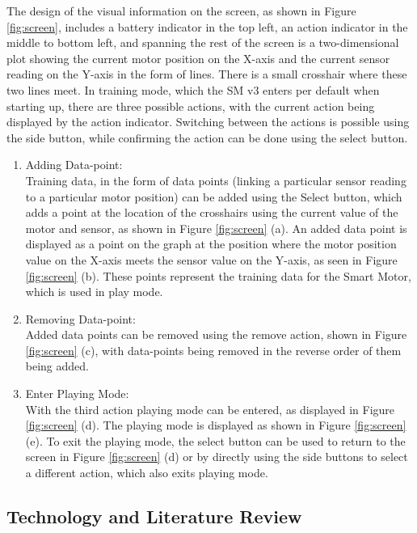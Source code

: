 The design of the visual information on the screen, as shown in Figure \ref{fig:screen}, includes a battery indicator in the top left, an action indicator in the middle to bottom left, and spanning the rest of the screen is a two-dimensional plot showing the current motor position on the X-axis and the current sensor reading on the Y-axis in the form of lines. There is a small crosshair where these two lines meet. In training mode, which the SM v3 enters per default when starting up, there are three possible actions, with the current action being displayed by the action indicator. Switching between the actions is possible using the side button, while confirming the action can be done using the select button. 
\begin{enumerate}
    \item Adding Data-point:\\
    Training data, in the form of data points (linking a particular sensor reading to a particular motor position) can be added using the Select button, which adds a point at the location of the crosshairs using the current value of the motor and sensor, as shown in Figure \ref{fig:screen} (a). An added data point is displayed as a point on the graph at the position where the motor position value on the X-axis meets the sensor value on the Y-axis, as seen in Figure \ref{fig:screen} (b). These points represent the training data for the Smart Motor, which is used in play mode.%
    \item Removing Data-point:\\
    Added data points can be removed using the remove action, shown in Figure \ref{fig:screen} (c), with data-points being removed in the reverse order of them being added.
    \item Enter Playing Mode:\\
    With the third action playing mode can be entered, as displayed in Figure \ref{fig:screen} (d). The playing mode is displayed as shown in Figure \ref{fig:screen} (e). To exit the playing mode, the select button can be used to return to the screen in Figure \ref{fig:screen} (d) or by directly using the side buttons to select a different action, which also exits playing mode.
\end{enumerate}

\subsection{\label{sec:methods_tech_review}Technology and Literature Review}

